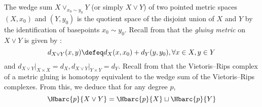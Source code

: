 
The wedge sum $X\vee_{x_0\sim y_0} Y$ (or simply $X\vee Y$) of two pointed metric spaces $(X,x_0)$ and $(Y,y_0)$ is the quotient space of the disjoint union of $X$ and $Y$ by the identification of basepoints $x_0\sim y_0$.
Recall from \cite{burago2001course,adamaszek2020homotopy} that the \emph{gluing metric} on $X\vee Y$ is given by \label{para:gluing}:
$$d_{X\vee Y}(x,y)\defeq d_X(x,x_0)+d_Y(y,y_0),\forall x\in X, y\in Y$$
and $d_{X\vee Y}\vert_{X\times X}=d_X,d_{X\vee Y}\vert_{Y\times Y}=d_Y$.
Recall from \cite[Prop.~3.7]{adamaszek2020homotopy} that the Vietoris--Rips complex of a metric gluing is homotopy equivalent to the wedge sum of the Vietoris--Rips complexes. From this, we deduce that for any degree $p$,
\begin{equation}\label{eq:wedge sum}
	\Hbarc{p}{X\vee Y}= \Hbarc{p}{X}\sqcup \Hbarc{p}{Y}
\end{equation}

